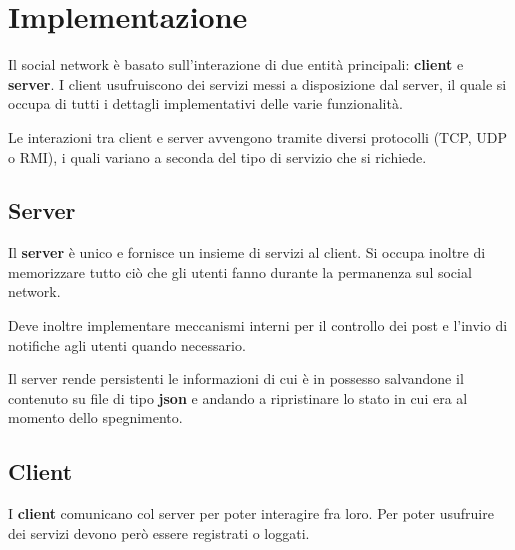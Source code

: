 \section{Implementazione}
Il social network \`e basato sull'interazione di due entit\`a principali: \textbf{client} e \textbf{server}. I client
usufruiscono dei servizi messi a disposizione dal server, il quale si occupa di tutti i dettagli implementativi delle
varie funzionalit\`a.

Le interazioni tra client e server avvengono tramite diversi protocolli (TCP, UDP o RMI), i quali variano a seconda del
tipo di servizio che si richiede.

\subsection{Server}
Il \textbf{server} \`e unico e fornisce un insieme di servizi al client. Si occupa inoltre di memorizzare tutto ci\`o che
gli utenti fanno durante la permanenza sul social network.

Deve inoltre implementare meccanismi interni per il controllo dei post e l'invio di notifiche agli utenti quando necessario.

Il server rende persistenti le informazioni di cui \`e in possesso salvandone il contenuto su file di tipo \textbf{json} e
andando a ripristinare lo stato in cui era al momento dello spegnimento.

\subsection{Client}
I \textbf{client} comunicano col server per poter interagire fra loro. Per poter usufruire dei servizi devono per\`o essere
registrati o loggati.

